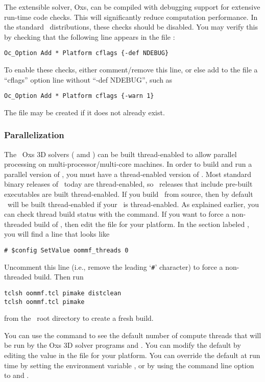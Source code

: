 The extensible solver, Oxs, can be compiled with debugging support
for extensive run-time code checks.  This will significantly reduce
computation performance.  In the standard \OOMMF\ distributions, these
checks should be disabled.  You may verify this by checking that
the following line appears in the file :
\begin{verbatim}
Oc_Option Add * Platform cflags {-def NDEBUG}
\end{verbatim}
To enable these checks, either comment/remove this line, or else add 
to the  file a ``cflags'' option line
without ``-def NDEBUG'', such as
\begin{verbatim}
Oc_Option Add * Platform cflags {-warn 1}
\end{verbatim}
The  file may be created if it does not
already exist.

\subsubsection{Parallelization}%
\label{sec:parallel}
The \OOMMF\ Oxs 3D solvers ( amd ) can be built
thread-enabled to allow parallel processing on
multi-processor/multi-core machines.  In order to build and run a
parallel version of \OOMMF, you must have a thread-enabled version of
\Tcl.  Most standard binary releases of \Tcl\ today are thread-enabled,
so \OOMMF\ releases that include pre-built executables are built
thread-enabled.  If you build \OOMMF\ from source, then by default
\OOMMF\ will be built thread-enabled if your \Tcl\ is thread-enabled.
As explained earlier, you can check thread build status with the
 command.  If you want to force a
non-threaded build of \OOMMF, then edit the  file
for your platform.  In the section labeled , you
will find a line that looks like
\begin{verbatim}
# $config SetValue oommf_threads 0
\end{verbatim}
Uncomment this line (i.e., remove the leading `\verb+#+' character) to
force a non-threaded build.  Then run
\begin{verbatim}
tclsh oommf.tcl pimake distclean
tclsh oommf.tcl pimake
\end{verbatim}
from the \OOMMF\ root directory to create a fresh build.

You can use the  command to see the
default number of compute threads that will be run by the Oxs 3D solver
programs  and .  You can modify the default by
editing the  value in the
 file for your platform.  You can override the
default at run time by setting the environment variable
, or by
using the command line option  to  and
.

